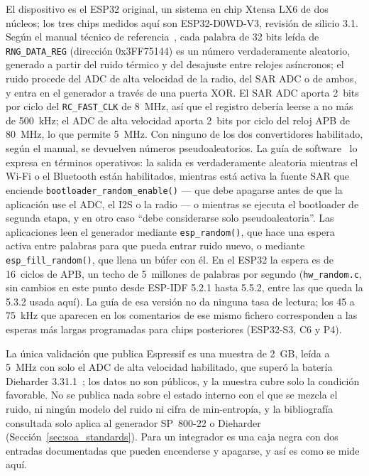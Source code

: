 El dispositivo es el ESP32 original, un sistema en chip Xtensa LX6 de dos
núcleos; los tres chips medidos aquí son ESP32-D0WD-V3, revisión de silicio
3.1. Según el manual técnico de
referencia~\cite{espressif_trm_esp32}, cada palabra de 32 bits leída de
\texttt{RNG\_DATA\_REG} (dirección 0x3FF75144) es un número verdaderamente
aleatorio, generado a partir del ruido térmico y del desajuste entre
relojes asíncronos; el ruido procede del ADC de alta velocidad de la
radio, del SAR ADC o de ambos, y entra en el generador a través de una
puerta XOR. El SAR ADC aporta 2~bits por ciclo del \texttt{RC\_FAST\_CLK}
de 8~MHz, así que el registro debería leerse a no más de 500~kHz; el ADC
de alta velocidad aporta 2~bits por ciclo del reloj APB de 80~MHz, lo que
permite 5~MHz. Con ninguno de los dos convertidores habilitado, según el
manual, se devuelven números pseudoaleatorios. La guía de
software~\cite{espressif_idf_random} lo expresa en términos operativos: la
salida es verdaderamente aleatoria mientras el Wi-Fi o el Bluetooth están
habilitados, mientras está activa la fuente SAR que enciende
\texttt{bootloader\_random\_enable()} --- que debe apagarse antes de que
la aplicación use el ADC, el I2S o la radio --- o mientras se ejecuta el
bootloader de segunda etapa, y en otro caso ``debe considerarse solo
pseudoaleatoria''. Las aplicaciones leen el generador mediante
\texttt{esp\_random()}, que hace una espera activa entre palabras para que
pueda entrar ruido nuevo, o mediante \texttt{esp\_fill\_random()}, que
llena un búfer con él. En el ESP32 la espera es de 16~ciclos de APB, un
techo de 5~millones de palabras por segundo (\texttt{hw\_random.c}, sin
cambios en este punto desde ESP-IDF 5.2.1 hasta 5.5.2, entre las que
queda la 5.3.2 usada aquí). La guía de esa versión no da ninguna tasa de
lectura; los 45 a 75~kHz que aparecen en los comentarios de ese mismo
fichero corresponden a las esperas más largas programadas para chips
posteriores (ESP32-S3, C6 y P4).

La única validación que publica Espressif es una muestra de 2~GB, leída a
5~MHz con solo el ADC de alta velocidad habilitado, que superó la batería
Dieharder 3.31.1~\cite{espressif_trm_esp32}; los datos no son públicos, y
la muestra cubre solo la condición favorable. No se publica nada sobre el
estado interno con el que se mezcla el ruido, ni ningún modelo del ruido
ni cifra de min-entropía, y la bibliografía consultada solo aplica al
generador SP~800-22 o Dieharder (Sección~\ref{sec:soa_standards}). Para un
integrador es una caja negra con dos entradas documentadas que pueden
encenderse y apagarse, y así es como se mide aquí.

